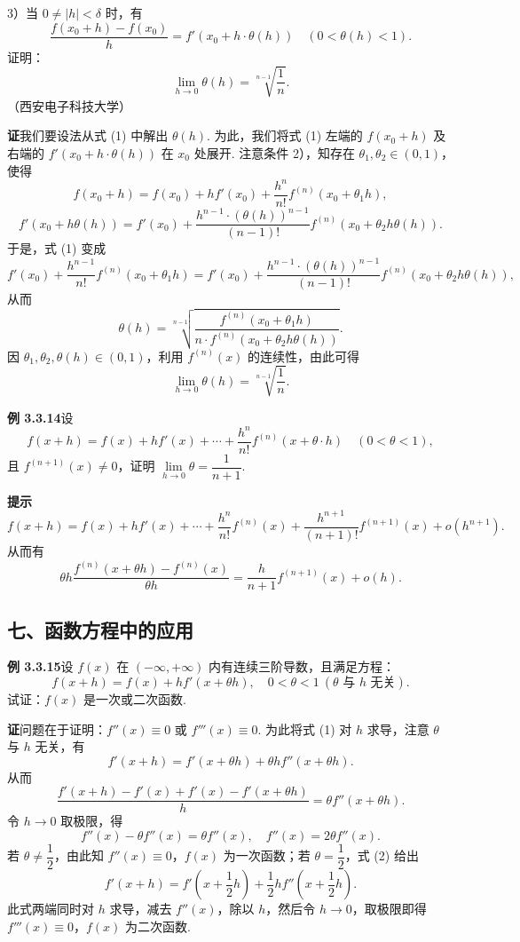\documentclass[UTF8,12pt,a4paper,fontset=fandol]{ctexart}
\begin{document}
3）当 $0\ne |h|<\delta$ 时，有
\[
  \frac{f(x_0+h)-f(x_0)}{h}=f'(x_0+h\cdot\theta(h))\quad(0<\theta(h)<1). \tag{1}
\]
证明：
\[
  \lim_{h\to0}\theta(h)=\sqrt[n-1]{\frac1n}.
\]
（西安电子科技大学）

\noindent\textbf{证}\quad 我们要设法从式 (1) 中解出 $\theta(h)$. 为此，我们将式 (1) 左端的 $f(x_0+h)$ 及右端的 $f'(x_0+h\cdot\theta(h))$ 在 $x_0$ 处展开. 注意条件 2），知存在 $\theta_1,\theta_2\in(0,1)$，使得
\[
  f(x_0+h)=f(x_0)+hf'(x_0)+\frac{h^n}{n!}f^{(n)}(x_0+\theta_1h),
\]
\[
  f'(x_0+h\theta(h))=f'(x_0)+\frac{h^{n-1}\cdot(\theta(h))^{n-1}}{(n-1)!}f^{(n)}(x_0+\theta_2h\theta(h)).
\]
于是，式 (1) 变成
\[
  f'(x_0)+\frac{h^{n-1}}{n!}f^{(n)}(x_0+\theta_1h)
  =f'(x_0)+\frac{h^{n-1}\cdot(\theta(h))^{n-1}}{(n-1)!}f^{(n)}(x_0+\theta_2h\theta(h)),
\]
从而
\[
  \theta(h)=
  \sqrt[n-1]{\frac{f^{(n)}(x_0+\theta_1h)}{n\cdot f^{(n)}(x_0+\theta_2h\theta(h))}}.
\]
因 $\theta_1,\theta_2,\theta(h)\in(0,1)$，利用 $f^{(n)}(x)$ 的连续性，由此可得
\[
  \lim_{h\to0}\theta(h)=\sqrt[n-1]{\frac1n}.
\]

\noindent\textbf{例 3.3.14}\quad 设
\[
  f(x+h)=f(x)+hf'(x)+\cdots+\frac{h^n}{n!}f^{(n)}(x+\theta\cdot h)\quad(0<\theta<1),
\]
且 $f^{(n+1)}(x)\ne0$，证明 $\lim\limits_{h\to0}\theta=\dfrac1{n+1}$.

\noindent\textbf{提示}\quad
\[
  f(x+h)=f(x)+hf'(x)+\cdots+\frac{h^n}{n!}f^{(n)}(x)
  +\frac{h^{n+1}}{(n+1)!}f^{(n+1)}(x)+o(h^{n+1}).
\]
从而有
\[
  \theta h\frac{f^{(n)}(x+\theta h)-f^{(n)}(x)}{\theta h}
  =\frac{h}{n+1}f^{(n+1)}(x)+o(h).
\]

\subsection*{七、函数方程中的应用}

\noindent\textbf{例 3.3.15}\quad 设 $f(x)$ 在 $(-\infty,+\infty)$ 内有连续三阶导数，且满足方程：
\[
  f(x+h)=f(x)+hf'(x+\theta h),\quad 0<\theta<1\ (\theta\text{ 与 }h\text{ 无关}). \tag{1}
\]
试证：$f(x)$ 是一次或二次函数.

\noindent\textbf{证}\quad 问题在于证明：$f''(x)\equiv0$ 或 $f'''(x)\equiv0$. 为此将式 (1) 对 $h$ 求导，注意 $\theta$ 与 $h$ 无关，有
\[
  f'(x+h)=f'(x+\theta h)+\theta hf''(x+\theta h). \tag{2}
\]
从而
\[
  \frac{f'(x+h)-f'(x)+f'(x)-f'(x+\theta h)}{h}
  =\theta f''(x+\theta h).
\]
令 $h\to0$ 取极限，得
\[
  f''(x)-\theta f''(x)=\theta f''(x),\quad f''(x)=2\theta f''(x).
\]
若 $\theta\ne\dfrac12$，由此知 $f''(x)\equiv0$，$f(x)$ 为一次函数；若 $\theta=\dfrac12$，式 (2) 给出
\[
  f'(x+h)=f'\left(x+\frac12h\right)+\frac12hf''\left(x+\frac12h\right).
\]
此式两端同时对 $h$ 求导，减去 $f''(x)$，除以 $h$，然后令 $h\to0$，取极限即得 $f'''(x)\equiv0$，$f(x)$ 为二次函数.
\end{document}
